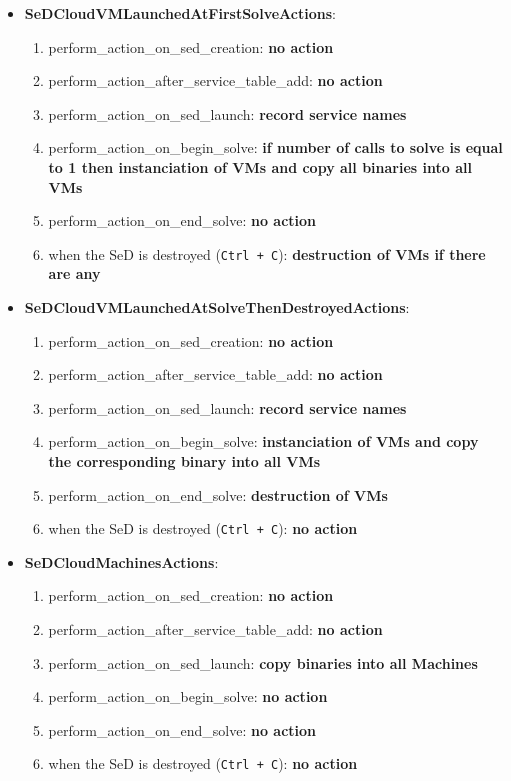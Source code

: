 \begin{itemize}
  \item \textbf{SeDCloudVMLaunchedAtFirstSolveActions}:
    \begin{enumerate}
        \item perform\_action\_on\_sed\_creation: \textbf{no action}
        \item perform\_action\_after\_service\_table\_add: \textbf{no action}
        \item perform\_action\_on\_sed\_launch: \textbf{record service names}
        \item perform\_action\_on\_begin\_solve: \textbf{if number of calls to solve is equal to 1 then instanciation of VMs and copy all binaries into all VMs}
        \item perform\_action\_on\_end\_solve: \textbf{no action}
        \item when the SeD is destroyed (\texttt{Ctrl + C}):
          \textbf{destruction of VMs if there are any}
      \end{enumerate}
  \item \textbf{SeDCloudVMLaunchedAtSolveThenDestroyedActions}:
    \begin{enumerate}
        \item perform\_action\_on\_sed\_creation: \textbf{no action}
        \item perform\_action\_after\_service\_table\_add: \textbf{no action}
        \item perform\_action\_on\_sed\_launch: \textbf{record service names}
        \item perform\_action\_on\_begin\_solve: \textbf{instanciation of VMs and copy the corresponding binary into all VMs}
        \item perform\_action\_on\_end\_solve: \textbf{destruction of VMs}
        \item when the SeD is destroyed (\texttt{Ctrl + C}): \textbf{no action}
      \end{enumerate}
  \item \textbf{SeDCloudMachinesActions}:
    \begin{enumerate}
        \item perform\_action\_on\_sed\_creation: \textbf{no action}
        \item perform\_action\_after\_service\_table\_add: \textbf{no action}
        \item perform\_action\_on\_sed\_launch: \textbf{copy binaries into all Machines}
        \item perform\_action\_on\_begin\_solve: \textbf{no action}
        \item perform\_action\_on\_end\_solve: \textbf{no action}
        \item when the SeD is destroyed (\texttt{Ctrl + C}): \textbf{no action}
   \end{enumerate}


\end{itemize}
